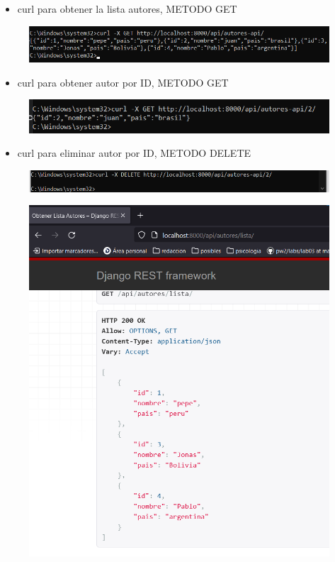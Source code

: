 \documentclass{article}
\begin{document}
	\begin{itemize}
		\item curl para obtener la lista autores, METODO GET
	\end{itemize}
	\begin{figure}[H]
		\centering
		\includegraphics[width=1\textwidth,keepaspectratio]{pruebas/curlObtenerAutores.png}
	\end{figure}
	
	\begin{itemize}
		\item curl para obtener autor por ID, METODO GET
	\end{itemize}
	\begin{figure}[H]
		\centering
		\includegraphics[width=1\textwidth,keepaspectratio]{pruebas/curlObtenerAutorId.png}
	\end{figure}
	
	\begin{itemize}
		\item curl para eliminar autor por ID, METODO DELETE
	\end{itemize}
	\begin{figure}[H]
		\centering
		\includegraphics[width=1\textwidth,keepaspectratio]{pruebas/curlEliminarAutor.png}
	\end{figure}
	\begin{figure}[H]
		\centering
		\includegraphics[width=1\textwidth, height=0.8\textwidth,keepaspectratio]{pruebas/tarea-autores-eliminado.png}
	\end{figure}
	
\end{document}
